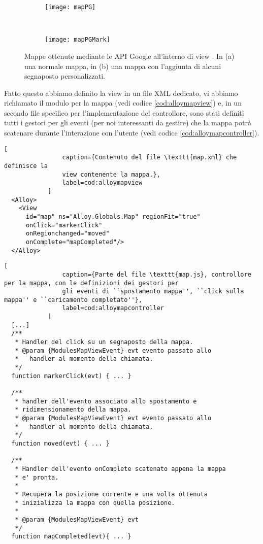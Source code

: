             \begin{figure}[H]
                \centering
                \begin{subfigure}[b]{0.485\textwidth}
                    \texttt{[image: mapPG]}
                    \caption{}
                    \label{fig:mapPG}
                \end{subfigure}
                ~
                \begin{subfigure}[b]{0.485\textwidth}
                    \texttt{[image: mapPGMark]}
                    \caption{}
                    \label{fig:mapPGMark}
                \end{subfigure}
                \caption{
                    Mappe ottenute mediante le API Google all'interno di
                    view \kendomob{}. In (a) una normale mappa, in
                    (b) una mappa con l'aggiunta di alcuni
                    segnaposto personalizzati.
                }
                \label{fig:PGMaps}
            \end{figure}
            Fatto questo abbiamo definito la view in un file XML dedicato, vi abbiamo richiamato
            il modulo per la mappa (vedi codice \ref{cod:alloymapview}) e, in un secondo file \js{} specifico per
            l'implementazione del controllore, sono stati definiti tutti i
            gestori per gli eventi (per noi interessanti da gestire) che la
            mappa potrà scatenare durante l'interazione con l'utente (vedi codice \ref{cod:alloymapcontroller}).
            \begin{lstlisting}[
                caption={Contenuto del file \texttt{map.xml} che definisce la
                view contenente la mappa.},
                label=cod:alloymapview
            ]
  <Alloy>
    <View
      id="map" ns="Alloy.Globals.Map" regionFit="true"
      onClick="markerClick"
      onRegionchanged="moved"
      onComplete="mapCompleted"/>
  </Alloy>
            \end{lstlisting}
            \begin{lstlisting}[
                caption={Parte del file \texttt{map.js}, controllore per la mappa, con le definizioni dei gestori per
                gli eventi di ``spostamento mappa'', ``click sulla mappa'' e ``caricamento completato''},
                label=cod:alloymapcontroller
            ]
  [...]
  /**
   * Handler del click su un segnaposto della mappa.
   * @param {ModulesMapViewEvent} evt evento passato allo
   *   handler al momento della chiamata.
   */
  function markerClick(evt) { ... }

  /**
   * handler dell'evento associato allo spostamento e
   * ridimensionamento della mappa.
   * @param {ModulesMapViewEvent} evt evento passato allo
   *   handler al momento della chiamata.
   */
  function moved(evt) { ... }

  /**
   * Handler dell'evento onComplete scatenato appena la mappa
   * e' pronta.
   *
   * Recupera la posizione corrente e una volta ottenuta
   * inizializza la mappa con quella posizione.
   *
   * @param {ModulesMapViewEvent} evt
   */
  function mapCompleted(evt){ ... }

            \end{lstlisting}
